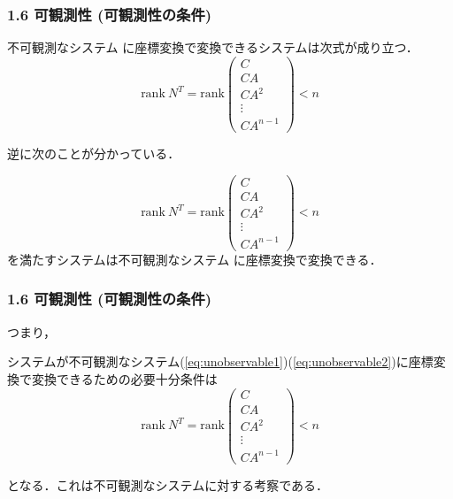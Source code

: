 \documentclass[10pt]{beamer}
\begin{document}
\begin{frame}[t]
\frametitle{1.6 可観測性 (可観測性の条件)}
\begin{block}{}
不可観測なシステム
に座標変換で変換できるシステムは次式が成り立つ．\\
   $$\mbox{rank}\ N^T
   = \mbox{rank}
    \left(\begin{array}{c}
           C        \\
     C A      \\
     C A^2    \\
     \vdots   \\
     C A^{n-1}
    \end{array}\right)
    < n$$
\end{block}
逆に次のことが分かっている．
\begin{block}{}
   $$\mbox{rank}\ N^T
   = \mbox{rank}
    \left(\begin{array}{c}
           C        \\
     C A      \\
     C A^2    \\
     \vdots   \\
     C A^{n-1}
    \end{array}\right)
    < n$$
    を満たすシステムは不可観測なシステム
    に座標変換で変換できる．
\end{block}
\end{frame}


\begin{frame}[t]
\frametitle{1.6 可観測性 (可観測性の条件)}
つまり，
\begin{block}{}
システムが不可観測なシステム(\ref{eq:unobservable1})(\ref{eq:unobservable2})に座標変換で変換できるための必要十分条件は
   $$\mbox{rank}\ N^T
   = \mbox{rank}
    \left(\begin{array}{c}
           C        \\
     C A      \\
     C A^2    \\
     \vdots   \\
     C A^{n-1}
    \end{array}\right)
    < n$$
\end{block}
となる．これは不可観測なシステムに対する考察である．
\end{frame}
\end{document}
